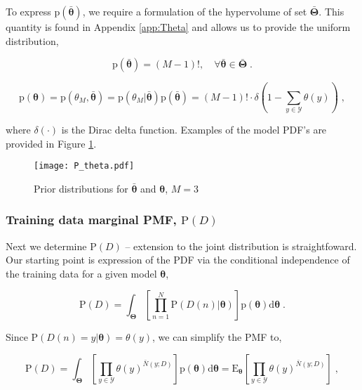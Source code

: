 \documentclass[12pt]{report}
\begin{document}
To express $\text{p}\left(\bar{\bm{\theta}}\right)$, we require a formulation of the hypervolume of set $\bar{\bm{\Theta}}$. This quantity is found in Appendix \ref{app:Theta} and allows us to provide the uniform distribution,

\begin{equation}
\text{p}\left(\bar{\bm{\theta}}\right)= (M-1)!,  \quad \forall \bar{\bm{\theta}} \in \bar{\bm{\Theta}} \;.
\end{equation}

\begin{equation}
\text{p}(\bm{\theta}) = \text{p}(\theta_M,\bar{\bm{\theta}}) = \text{p}\left( \theta_M | \bar{\bm{\theta}} \right) \text{p}\left(\bar{\bm{\theta}}\right)
= (M-1)! \cdot \delta\left( 1 - \sum_{y \in \mathcal{Y}} \theta(y) \right) \;,
\end{equation}

where $\delta(\cdot)$ is the Dirac delta function. Examples of the model PDF's are provided in Figure \ref{fig:P_theta}.

\begin{figure}
\centering
\texttt{[image: P\_theta.pdf]}
\caption{Prior distributions for $\bar{\bm{\theta}}$ and $\bm{\theta}$, $M=3$}
\label{fig:P_theta}
\end{figure}


\subsubsection{Training data marginal PMF, $\text{P}(D)$}

Next we determine $\text{P}(D)$ -- extension to the joint distribution is straightfoward. Our starting point is expression of the PDF via the conditional independence of the training data for a given model $\bm{\theta}$,

\begin{equation}
\text{P}(D) = \int_{\bm{\Theta}} \left[ \prod_{n=1}^N \text{P}(D(n) | \bm{\theta}) \right] \text{p}(\bm{\theta}) \mathrm{d}\bm{\theta} \;.
\end{equation}

Since $\text{P}(D(n) = y | \bm{\theta}) = \theta(y)$, we can simplify the PMF to,

\begin{equation} \label{P_D_int2}
\text{P}(D) = \int_{\bm{\Theta}} \left[ \prod_{y \in \mathcal{Y}} \theta(y)^{\bar{N}(y;D)} \right] \text{p}(\bm{\theta}) \mathrm{d}\bm{\theta} 
= \text{E}_{\bm{\theta}} \left[ \prod_{y \in \mathcal{Y}} \theta(y)^{\bar{N}(y;D)} \right] \;,
\end{equation}
\end{document}
